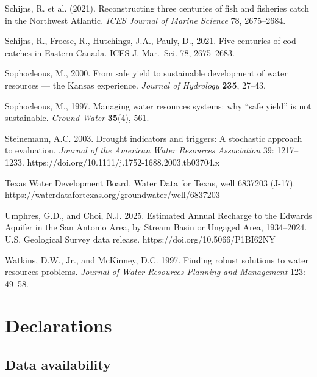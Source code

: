 Schijns, R. et al. (2021). Reconstructing three centuries of fish and
fisheries catch in the Northwest Atlantic. \emph{ICES Journal of Marine
Science} 78, 2675--2684.

Schijns, R., Froese, R., Hutchings, J.A., Pauly, D., 2021.
Five centuries of cod catches in Eastern Canada. ICES J. Mar.~Sci. 78,
2675--2683.

Sophocleous, M., 2000. From safe yield to sustainable development of water resources --- the
Kansas experience. \emph{Journal of Hydrology} \textbf{235}, 27--43.

Sophocleous, M., 1997. Managing water resources systems: why ``safe yield'' is not
sustainable. \emph{Ground Water} \textbf{35}(4), 561.

Steinemann, A.C. 2003. Drought indicators and triggers: A stochastic
approach to evaluation. \emph{Journal of the American Water Resources
Association} 39: 1217--1233.
https://doi.org/10.1111/j.1752-1688.2003.tb03704.x

Texas Water Development Board. Water Data for Texas, well 6837203
(J-17). https://waterdatafortexas.org/groundwater/well/6837203

Umphres, G.D., and Choi, N.J. 2025. Estimated Annual Recharge to the
Edwards Aquifer in the San Antonio Area, by Stream Basin or Ungaged
Area, 1934--2024. U.S. Geological Survey data release.
https://doi.org/10.5066/P1BI62NY

Watkins, D.W., Jr., and McKinney, D.C. 1997. Finding robust solutions to
water resources problems. \emph{Journal of Water Resources Planning and
Management} 123: 49--58.

\section*{Declarations}

\subsection*{Data availability}

